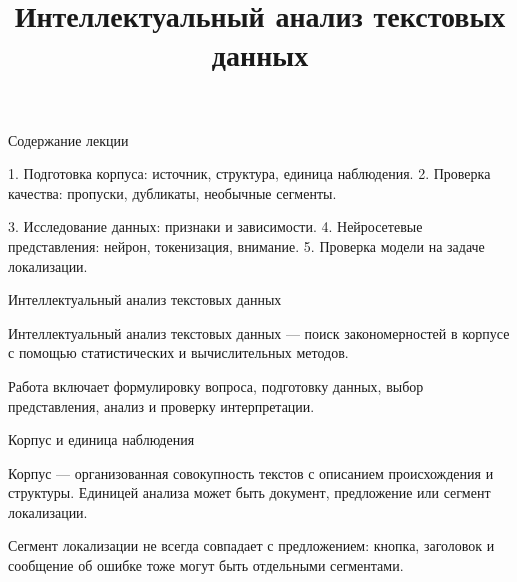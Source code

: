 \documentclass[aspectratio=169,12pt]{beamer}
\author{}\date{}
\title{Интеллектуальный анализ текстовых данных}
\begin{document}
\begin{frame}[plain]\vspace{0.6cm}{\large Подготовка корпуса, исследование зависимостей и нейросетевые представления\par}\end{frame}
\begin{frame}{Содержание лекции}
\color{ink}
{\small 1. Подготовка корпуса: источник, структура, единица наблюдения. 2. Проверка качества: пропуски, дубликаты, необычные сегменты.
\par\vspace{0.6em}3. Исследование данных: признаки и зависимости. 4. Нейросетевые представления: нейрон, токенизация, внимание. 5. Проверка модели на задаче локализации.}
\end{frame}

\begin{frame}{Интеллектуальный анализ текстовых данных}
\color{ink}
{\small Интеллектуальный анализ текстовых данных — поиск закономерностей в корпусе с помощью статистических и вычислительных методов.
\par\vspace{0.6em}Работа включает формулировку вопроса, подготовку данных, выбор представления, анализ и проверку интерпретации.}
\end{frame}

\begin{frame}{Корпус и единица наблюдения}
\color{ink}
{\small Корпус — организованная совокупность текстов с описанием происхождения и структуры. Единицей анализа может быть документ, предложение или сегмент локализации.
\par\vspace{0.6em}Сегмент локализации не всегда совпадает с предложением: кнопка, заголовок и сообщение об ошибке тоже могут быть отдельными сегментами.}
\end{frame}
\end{document}
